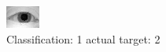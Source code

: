\begin{figure}[h!]
\begin{center}
\includegraphics[width=0.60\columnwidth]{figures/ID877_class_1_target_2.png}
\end{center}
\caption{ Classification: 1 actual target: 2}
\label{fig:ID877_class_1_target_2}
\end{figure}
